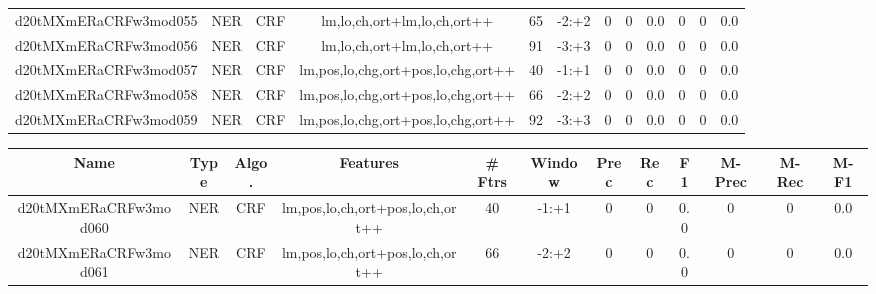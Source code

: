 \documentclass[a4paper]{article}
\begin{document}
\begin{landscape}
\begin{center}
\begin{tabular}{ |c|c|c|c|c|c|c|c|c|c|c|c|}
 
 	
 	\small{ d20tMXmERaCRFw3mod055 } & \small{ NER} & \small{  CRF }  & lm,lo,ch,ort+lm,lo,ch,ort++  &  65 &  \small{  -2:+2 }  &  0 & 0 & 0.0  &  0 & 0 & 0.0 \\
 	

 
 	
 	\small{ d20tMXmERaCRFw3mod056 } & \small{ NER} & \small{  CRF }  & lm,lo,ch,ort+lm,lo,ch,ort++  &  91 &  \small{  -3:+3 }  &  0 & 0 & 0.0  &  0 & 0 & 0.0 \\
 	

 
 	
 	\small{ d20tMXmERaCRFw3mod057 } & \small{ NER} & \small{  CRF }  & lm,pos,lo,chg,ort+pos,lo,chg,ort++  &  40 &  \small{  -1:+1 }  &  0 & 0 & 0.0  &  0 & 0 & 0.0 \\
 	

 
 	
 	\small{ d20tMXmERaCRFw3mod058 } & \small{ NER} & \small{  CRF }  & lm,pos,lo,chg,ort+pos,lo,chg,ort++  &  66 &  \small{  -2:+2 }  &  0 & 0 & 0.0  &  0 & 0 & 0.0 \\
 	

 
 	
 	\small{ d20tMXmERaCRFw3mod059 } & \small{ NER} & \small{  CRF }  & lm,pos,lo,chg,ort+pos,lo,chg,ort++  &  92 &  \small{  -3:+3 }  &  0 & 0 & 0.0  &  0 & 0 & 0.0 \\
 	
 \hline
\end{tabular}
\end{center}




\begin{center}
\begin{tabular}{ |c|c|c|c|c|c|c|c|c|c|c|c|} 
 \hline
 	Name & Type & Algo. & Features & \# Ftrs & Window & Prec & Rec & F1 & M-Prec & M-Rec & M-F1\\
 \hline

 	

 
 	
 	\small{ d20tMXmERaCRFw3mod060 } & \small{ NER} & \small{  CRF }  & lm,pos,lo,ch,ort+pos,lo,ch,ort++  &  40 &  \small{  -1:+1 }  &  0 & 0 & 0.0  &  0 & 0 & 0.0 \\
 	

 
 	
 	\small{ d20tMXmERaCRFw3mod061 } & \small{ NER} & \small{  CRF }  & lm,pos,lo,ch,ort+pos,lo,ch,ort++  &  66 &  \small{  -2:+2 }  &  0 & 0 & 0.0  &  0 & 0 & 0.0 \\
 	


\end{tabular}
\end{center}
\end{landscape}
\end{document}
